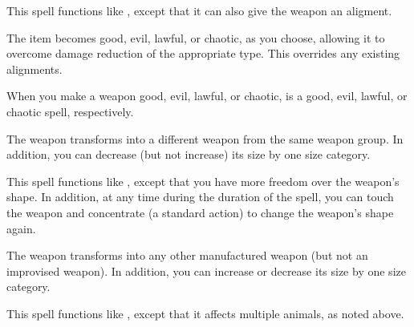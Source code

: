 \begin{spelleffect}
  This spell functions like , except that it can also give the weapon an aligment.
\end{spelleffect}
\begin{spellsuccess}
    The item becomes good, evil, lawful, or chaotic, as you choose, allowing it to overcome damage reduction of the appropriate type. This overrides any existing alignments.
\end{spellsuccess}
\begin{spellnotes}
  When you make a weapon good, evil, lawful, or chaotic,  is a good, evil, lawful, or chaotic spell, respectively.
\end{spellnotes}

\spelldur{\durmed}
\begin{spellsuccess}
    The weapon transforms into a different weapon from the same weapon group. In addition, you can decrease (but not increase) its size by one size category.
\end{spellsuccess}

\begin{spelleffect}
    This spell functions like , except that you have more freedom over the weapon's shape. In addition, at any time during the duration of the spell, you can touch the weapon and concentrate (a standard action) to change the weapon's shape again.
\end{spelleffect}
\begin{spellsuccess}
    The weapon transforms into any other manufactured weapon (but not an improvised weapon). In addition, you can increase or decrease its size by one size category.
\end{spellsuccess}

\spellrng{\rngmed}
\begin{spelleffect}
  This spell functions like , except that it affects multiple animals, as noted above.
\end{spelleffect}

